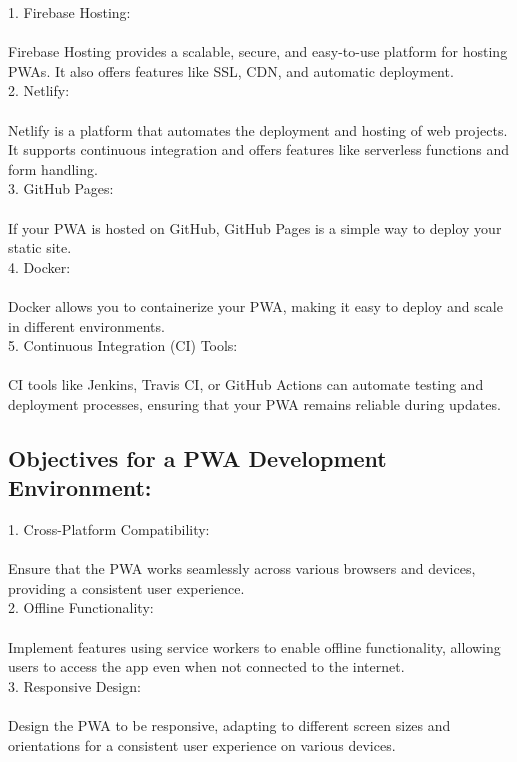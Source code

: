 \documentclass[journal]{IEEEtran}
\begin{document}
1. Firebase Hosting:\\
   \\Firebase Hosting provides a scalable, secure, and easy-to-use platform for hosting PWAs. It also offers features like SSL, CDN, and automatic deployment.\\

2. Netlify:\\
   \\Netlify is a platform that automates the deployment and hosting of web projects. It supports continuous integration and offers features like serverless functions and form handling.\\

3. GitHub Pages:\\
   \\If your PWA is hosted on GitHub, GitHub Pages is a simple way to deploy your static site.\\

4. Docker:\\
   \\Docker allows you to containerize your PWA, making it easy to deploy and scale in different environments.\\

5. Continuous Integration (CI) Tools:\\
   \\CI tools like Jenkins, Travis CI, or GitHub Actions can automate testing and deployment processes, ensuring that your PWA remains reliable during updates.\\

\subsection{Objectives for a PWA Development Environment:}

1. Cross-Platform Compatibility:\\
   \\Ensure that the PWA works seamlessly across various browsers and devices, providing a consistent user experience.\\

2. Offline Functionality:\\
   \\Implement features using service workers to enable offline functionality, allowing users to access the app even when not connected to the internet.\\

3. Responsive Design:\\
   \\Design the PWA to be responsive, adapting to different screen sizes and orientations for a consistent user experience on various devices.\\
\end{document}
